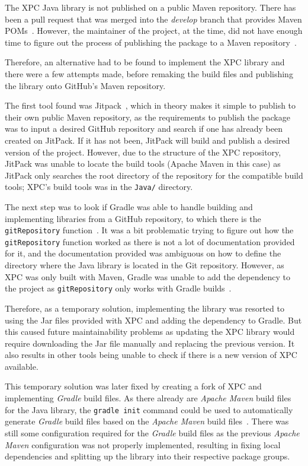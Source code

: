 \documentclass[../dissertation.tex]{subfiles}
\begin{document}
The XPC Java library is not published on a public Maven repository. There has been a pull
request that was merged into the \textit{develop} branch that provides Maven POMs~\cite{xpc:pom}.
However, the maintainer of the project, at the time, did not have enough time to figure out
the process of publishing the package to a Maven repository~\cite{xpc:pom-time}.

Therefore, an alternative had to be found to implement the XPC library and there were
a few attempts made, before remaking the build files and publishing the library onto
GitHub's Maven repository.

The first tool found was Jitpack~\cite{jitpack}, which in theory makes it simple to
publish to their own public Maven repository, as the requirements to publish the package
was to input a desired GitHub repository and search if one has already been created on
JitPack. If it has not been, JitPack will build and publish a desired version of
the project. However, due to the structure of the XPC repository, JitPack was unable to
locate the build tools (Apache Maven in this case) as JitPack only searches the root directory
of the repository for the compatible build tools; XPC's build tools was in the \lstinline|Java/|
directory.

The next step was to look if Gradle was able to handle building and implementing libraries
from a GitHub repository, to which there is the \lstinline|gitRepository| function~\cite{gradle:gitRepository}.
It was a bit problematic trying to figure out how the \lstinline|gitRepository| function worked
as there is not a lot of documentation provided for it, and the documentation provided was
ambiguous on how to define the directory where the Java library is located in the Git
repository. However, as XPC was only built with Maven, Gradle was unable to add the dependency
to the project as \lstinline|gitRepository| only works with Gradle builds~\cite{gradle:gitRepoGradleOnly}.

Therefore, as a temporary solution, implementing the library was resorted to using the Jar
files provided with XPC and adding the dependency to Gradle. But this caused future maintainability
problems as updating the XPC library would require downloading the Jar file manually and replacing
the previous version. It also results in other tools being unable to check if there is a new
version of XPC available.

This temporary solution was later fixed by creating a fork of XPC and implementing 
\textit{Gradle} build files.
As there already are \textit{Apache Maven} build files for the Java library,
the \lstinline|gradle init| command could be used to automatically generate
\textit{Gradle} build files based on the \textit{Apache Maven} build files~\cite{gradle:migratePOM}.
There was still some configuration required for the \textit{Gradle}
build files as the previous \textit{Apache Maven} configuration was not
properly implemented, resulting in fixing local dependencies and splitting up the
library into their respective package groups.
\end{document}
